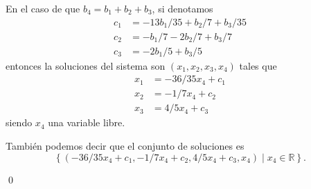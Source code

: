 \documentclass[handout]{beamer} %
\renewcommand{\_}[1]{_{\left[ #1 \right]}}
\renewcommand{\^}[1]{^{\left[ #1 \right]}}
\begin{document}

\begin{frame}
    
    En  el caso de que $b_4 = b_1 + b_2 + b_3$, si denotamos
    \begin{align*}
        c_1 &=  -13b_1/35 + b_2/7 + b_3/35 \\
        c_2 &= -b_1/7 -2 b_2/7 + b_3/7 \\
        c_3 &= -2b_1/5 + b_3/5
    \end{align*}
    entonces la soluciones del sistema son $(x_1,x_2,x_3,x_4)$ tales que
    \begin{align*}
        x_1 &= -36/35x_4 + c_1\\
        x_2 &= -1/7 x_4 + c_2 \\
        x_3 &= 4/5 x_4 + c_3
    \end{align*}
    siendo $x_4$ una variable libre.

    También podemos decir que el conjunto de soluciones es
    $$
    \left\{(-36/35x_4 + c_1, -1/7 x_4 + c_2, 4/5 x_4 + c_3, x_4) \mid x_4 \in \mathbb R\right\}.
    $$

\qed

\end{frame}
\end{document}
